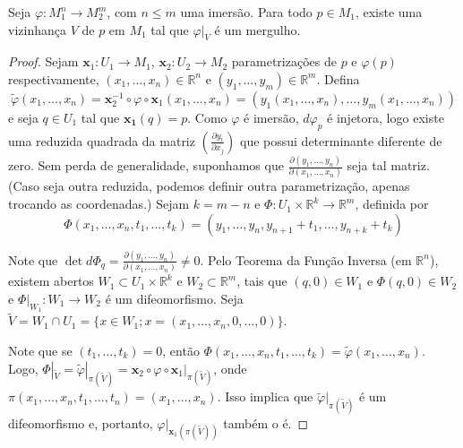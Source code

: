 	\begin{proposition}
		\label{prop:imersao-localmente-mergulho}
		Seja $\varphi:M_{1}^{n}\to M_{2}^{m}$, com $n\leq m$ uma imersão. Para todo $p \in M_{1}$, existe uma vizinhança $V$ de $p$ em $M_{1}$ tal que $\varphi|_{V}$ é um mergulho.
		\begin{proof}

			Sejam $\mathbf{x}_{1}:U_{1}\to M_{1}$, $\mathbf{x}_{2}:U_{2}\to M_{2}$ parametrizações de $p$ e $\varphi(p)$ respectivamente, $(x_{1}, \dots, x_{n}) \in \mathbb{R}^{n}$ e $(y_{1}, \dots, y_{m}) \in \mathbb{R}^{m}$. Defina
			\begin{equation*}
				\tilde{\varphi}(x_{1}, \dots, x_{n})=\mathbf{x}_{2}^{-1} \circ \varphi \circ \mathbf{x}_{1}(x_{1}, \dots, x_{n})=(y_{1}(x_{1}, \dots, x_{n}), \dots, y_{m}(x_{1}, \dots, x_{n}))
			\end{equation*}
			e seja $q \in U_{1}$ tal que $\mathbf{x_{1}}(q)=p$.
			Como $\varphi$ é imersão, $d\varphi_{p}$ é injetora, logo existe uma reduzida quadrada da matriz $\left( \frac{\partial y_{i}}{\partial x_{j}} \right)$ que possui determinante diferente de zero. Sem perda de generalidade, suponhamos que $\frac{\partial(y_{1}, \dots, y_{n})}{\partial(x_{1}, \dots,x_{n})}$ seja tal matriz. (Caso seja outra reduzida, podemos definir outra parametrização, apenas trocando as coordenadas.)
			Sejam $k=m-n$ e  $\Phi:U_{1} \times \mathbb{R}^{k}\to \mathbb{R}^{m}$, definida por
			\begin{equation*}
				\Phi(x_{1}, \dots, x_{n}, t_{1}, \dots, t_{k})= (y_{1}, \dots, y_{n}, y_{n+1}+t_{1}, \dots, y_{n+k}+t_{k})
			\end{equation*}

			Note que $\det d\Phi_{q}=\frac{\partial(y_{1}, \dots, y_{n})}{\partial(x_{1}, \dots,x_{n})} \neq0$.
			Pelo Teorema da Função Inversa (em $\mathbb{R}^{n}$), existem abertos $W_{1} \subset U_{1}\times \mathbb{R}^{k}$ e $W_{2} \subset \mathbb{R}^{m}$, tais que $(q, 0) \in W_{1}$ e $\Phi(q, 0) \in W_{2}$ e $\Phi|_{W_{1}}:W_{1}\to W_{2}$ é um difeomorfismo.
			Seja $\tilde{V}=W_{1} \cap U_{1} = \{ x \in W_{1}; x=(x_{1}, \dots, x_{n}, 0, \dots, 0) \}$.

			Note que se $(t_{1}, \dots, t_{k})=0$, então $\Phi(x_{1}, \dots, x_{n}, t_{1}, \dots, t_{k})=\tilde{\varphi}(x_{1}, \dots, x_{n})$. Logo, $\Phi|_{\tilde{V}}=\tilde{\varphi}|_{\pi(\tilde{V})}=\mathbf{x}_{2}\circ \varphi \circ \mathbf{x}_{1}|_{\pi(\tilde{V})}$, onde $\pi(x_{1}, \dots, x_{n}, t_{1}, \dots, t_{n})=(x_{1}, \dots, x_{n})$.
			Isso implica que $\tilde{\varphi}|_{\pi(\tilde{V})}$  é um difeomorfismo e, portanto, $\varphi|_{\mathbf{x}_{1}(\pi(\tilde{V}))}$ também o é.
		\end{proof}
	\end{proposition}
